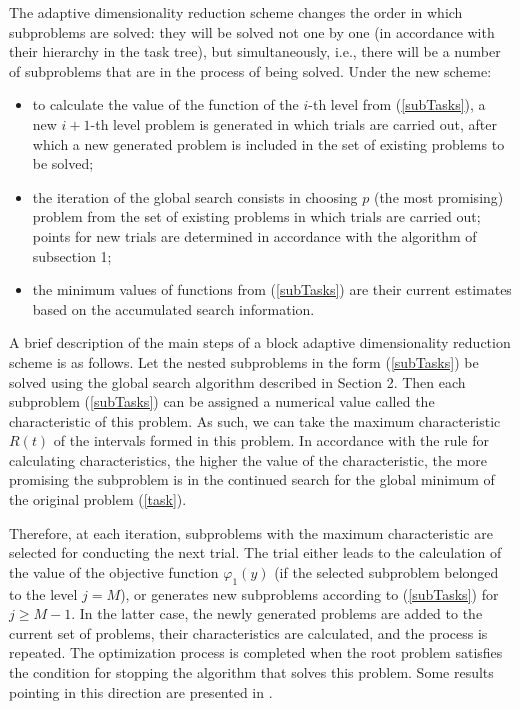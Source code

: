 \documentclass{svproc}
\begin{document}
   The adaptive dimensionality reduction scheme changes the order in which subproblems are solved: they will be solved not one by one (in accordance with their hierarchy in the task tree), but simultaneously, i.e., there will be a number of subproblems that are in the process of being solved. Under the new scheme:	
	\begin{itemize}
		\item to calculate the value of the function of the \(i\)-th level from (\ref{subTasks}), a new \(i+1\)-th level problem is generated in which trials are carried out, after which a new generated problem is included in the set of existing problems to be solved;
		\item the iteration of the global search consists in choosing \(p\) (the most promising) problem from the set of existing problems in which trials are carried out; points for new trials are determined in accordance with the algorithm of subsection 1;
		\item the minimum values of functions from (\ref{subTasks}) are their current estimates based on the accumulated search information.
	\end{itemize}
     
A brief description of the main steps of a block adaptive dimensionality reduction scheme is as follows.
Let the nested subproblems in the form (\ref{subTasks}) be solved using the global search algorithm described in Section 2. Then each subproblem (\ref{subTasks}) can be assigned a numerical value called the characteristic of this problem. As such, we can take the maximum characteristic \(R(t)\) of the intervals formed in this problem. In accordance with the rule for calculating characteristics, the higher the value of the characteristic, the more promising the subproblem is in the continued search for the global minimum of the original problem (\ref{task}). 

Therefore, at each iteration, subproblems with the maximum characteristic are selected for conducting the next trial. The trial either leads to the calculation of the value of the objective function \(\varphi_1(y)\) (if the selected subproblem belonged to the level \(j=M\)), or generates new subproblems according to (\ref{subTasks}) for \(j \geqslant  M-1\). In the latter case, the newly generated problems are added to the current set of problems, their characteristics are calculated, and the process is repeated. The optimization process is completed when the root problem satisfies the condition for stopping the algorithm that solves this problem. Some results pointing in this direction are presented in \cite{Barkalov2020}.
\end{document}
